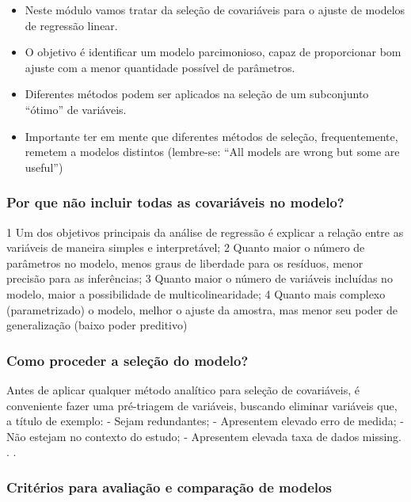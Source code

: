 \documentclass[
]{article}
\providecommand{\tightlist}{%
  \setlength{\itemsep}{0pt}\setlength{\parskip}{0pt}}
\begin{document}
{\begin{itemize}
\tightlist
\item
  Neste módulo vamos tratar da seleção de covariáveis para o ajuste de
  modelos de regressão linear.
\item
  O objetivo é identificar um modelo parcimonioso, capaz de proporcionar
  bom ajuste com a menor quantidade possível de parâmetros.
\item
  Diferentes métodos podem ser aplicados na seleção de um subconjunto
  ``ótimo'' de variáveis.
\item
  Importante ter em mente que diferentes métodos de seleção,
  frequentemente, remetem a modelos distintos (lembre-se: ``All models
  are wrong but some are useful'')
\end{itemize}

\subsubsection{Por que não incluir todas as covariáveis no
modelo?}\label{por-que-nuxe3o-incluir-todas-as-covariuxe1veis-no-modelo}

1 Um dos objetivos principais da análise de regressão é explicar a
relação entre as variáveis de maneira simples e interpretável; 2 Quanto
maior o número de parâmetros no modelo, menos graus de liberdade para os
resíduos, menor precisão para as inferências; 3 Quanto maior o número de
variáveis incluídas no modelo, maior a possibilidade de
multicolinearidade; 4 Quanto mais complexo (parametrizado) o modelo,
melhor o ajuste da amostra, mas menor seu poder de generalização (baixo
poder preditivo)

\subsubsection{Como proceder a seleção do
modelo?}\label{como-proceder-a-seleuxe7uxe3o-do-modelo}

Antes de aplicar qualquer método analítico para seleção de covariáveis,
é conveniente fazer uma pré-triagem de variáveis, buscando eliminar
variáveis que, a título de exemplo: - Sejam redundantes; - Apresentem
elevado erro de medida; - Não estejam no contexto do estudo; -
Apresentem elevada taxa de dados missing. . .

\subsubsection{Critérios para avaliação e comparação de
modelos}\label{crituxe9rios-para-avaliauxe7uxe3o-e-comparauxe7uxe3o-de-modelos}

}
\end{document}
